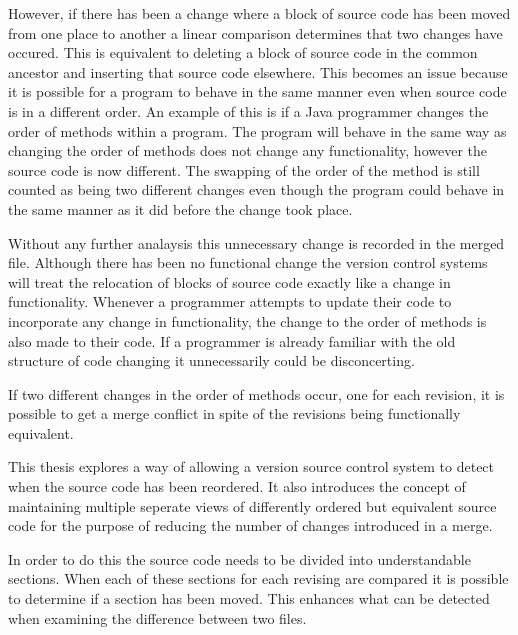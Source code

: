 
However, if there has been a change where a block of source code has been moved from one place to another a linear comparison determines that two changes have occured.  This is equivalent to deleting a block of source code in the common ancestor and inserting that source code elsewhere. This becomes an issue because it is possible for a program to behave in the same manner even when source code is in a different order.  An example of this is if a Java programmer changes the order of methods within a program.  The program will behave in the same way as changing the order of methods does not change any functionality, however the source code is now different. The swapping of the order of the method is still counted as being two different changes even though the program could behave in the same manner as it did before the change took place.

Without any further analaysis this unnecessary change is recorded in the merged file.  Although there has been no functional change the version control systems will treat the relocation of blocks of source code exactly like a change in functionality.  Whenever a programmer attempts to update their code to incorporate any change in functionality, the change to the order of methods is also made to their code.  If a programmer is already familiar with the old structure of code changing it unnecessarily could be disconcerting.   

If two different changes in the order of methods occur, one for each revision, it is possible to get a merge conflict in spite of the revisions being functionally equivalent.

This thesis explores a way of allowing a version source control system to detect when the source code has been reordered.  It also introduces the concept of maintaining multiple seperate views of differently ordered but equivalent source code for the purpose of reducing the number of changes introduced in a merge. 
 
In order to do this the source code needs to be divided into understandable sections. When each of these sections for each revising are compared it is possible to determine if a section has been moved.  This enhances what can be detected when examining the difference between two files.



